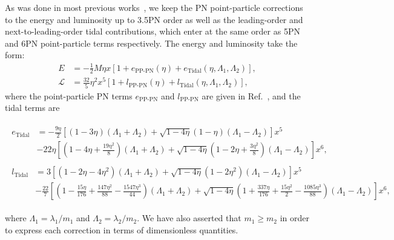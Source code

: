 \documentclass[twocolumn,prd,amssymb,aps,nofootinbib,showpacs,epsf]{revtex4}
\begin{document}
As was done in most previous works~\cite{WadeCreightonOchsner2014, DelPozzoLiAgathos2013, Favata2014, YagiYunes2014}, we keep the PN point-particle corrections to the energy and luminosity up to 3.5PN order as well as the leading-order and next-to-leading-order tidal contributions, which enter at the same order as 5PN and 6PN point-particle terms respectively.  The energy and luminosity take the form:
\begin{align}
E &= - \frac{1}{2} M \eta x \left[1 + e_\text{PP-PN}(\eta) + e_\text{Tidal}(\eta, \Lambda_1, \Lambda_2)\right], \\
\mathcal{L} &= \frac{32}{5}\eta^2 x^5 \left[ 1 + l_\text{PP-PN}(\eta) + l_\text{Tidal}(\eta, \Lambda_1, \Lambda_2)\right],
\end{align}
where the point-particle PN terms $e_\text{PP-PN}$ and $l_\text{PP-PN}$ are given in Ref.~\cite{Blanchet2014Review}, and the tidal terms are
\begin{widetext}
\begin{align}
\begin{split}
e_\text{Tidal} &= -\frac{9\eta}{2} \left[ (1-3\eta)(\Lambda_1+\Lambda_2) + \sqrt{1-4\eta}(1-\eta)(\Lambda_1-\Lambda_2) \right]x^5 \\
& - 22\eta \left[ \left(1-4\eta+\frac{19\eta^2}{8}\right)(\Lambda_1+\Lambda_2) + \sqrt{1-4\eta}\left(1-2\eta+\frac{3\eta^2}{8}\right)(\Lambda_1-\Lambda_2) \right]x^6,
\end{split} \\
\begin{split}
l_\text{Tidal} &= 3 \left[ (1-2\eta-4\eta^2)(\Lambda_1+\Lambda_2) + \sqrt{1-4\eta}(1-2\eta^2)(\Lambda_1-\Lambda_2) \right]x^5 \\
& - \frac{22}{7} \left[ \left(1-\frac{15\eta}{176}+\frac{147\eta^2}{88}-\frac{1547\eta^3}{44}\right)(\Lambda_1+\Lambda_2) + \sqrt{1-4\eta}\left(1+\frac{337\eta}{176}+\frac{15\eta^2}{2}-\frac{1085\eta^3}{88}\right)(\Lambda_1-\Lambda_2) \right]x^6,
\end{split}
\end{align}
\end{widetext}
where $\Lambda_1=\lambda_1/m_1$ and $\Lambda_2=\lambda_2/m_2$.  We have also asserted that $m_1 \ge m_2$ in order to express each correction in terms of dimensionless quantities.
\end{document}
